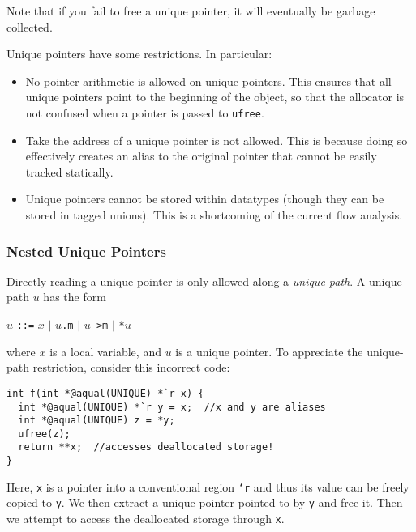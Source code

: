 Note that if you fail to free a unique pointer, it will eventually be
garbage collected.

Unique pointers have some restrictions.  In particular:
\begin{itemize}
\item No pointer arithmetic is allowed on unique pointers.  This ensures
  that all unique pointers point to the beginning of the object, so that the
  allocator is not confused when a pointer is passed to \texttt{ufree}.
\item Take the address of a unique pointer is not allowed.  This is because
  doing so effectively creates an alias to the original pointer that cannot
  be easily tracked statically.
\item Unique pointers cannot be stored within datatypes (though they can be
  stored in tagged unions).  This is a shortcoming of the current flow
  analysis.
\end{itemize}

\subsubsection{Nested Unique Pointers}

Directly reading a unique pointer is only allowed along a \emph{unique
path}.  A unique path $u$ has the form
\begin{center}
$u$ \texttt{::=} $x$ $\mid$ $u$\texttt{.m} $\mid$ $u$\texttt{->m} $\mid$ \texttt{*}$u$
\end{center}
where $x$ is a local variable, and $u$ is a unique pointer.  To
appreciate the unique-path restriction, consider this incorrect code:
\begin{verbatim}
int f(int *@aqual(UNIQUE) *`r x) {
  int *@aqual(UNIQUE) *`r y = x;  //x and y are aliases
  int *@aqual(UNIQUE) z = *y;
  ufree(z);
  return **x;  //accesses deallocated storage!
}
\end{verbatim}
Here, \texttt{x} is a pointer into a conventional region \texttt{`r} and
thus its value can be freely copied to \texttt{y}.  We then extract a unique
pointer pointed to by \texttt{y} and free it.  Then we attempt to access the
deallocated storage through \texttt{x}.

